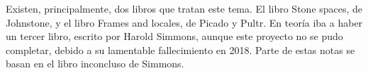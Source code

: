 Existen, principalmente, dos libros que tratan este tema.
El libro Stone spaces, de Johnstone,
y el libro Frames and locales, de Picado y Pultr.
En teoría iba a haber un tercer libro, escrito por Harold Simmons,
aunque este proyecto no se pudo completar, debido a su
lamentable fallecimiento en 2018.
Parte de estas notas se basan en el libro inconcluso de Simmons.

%
%
